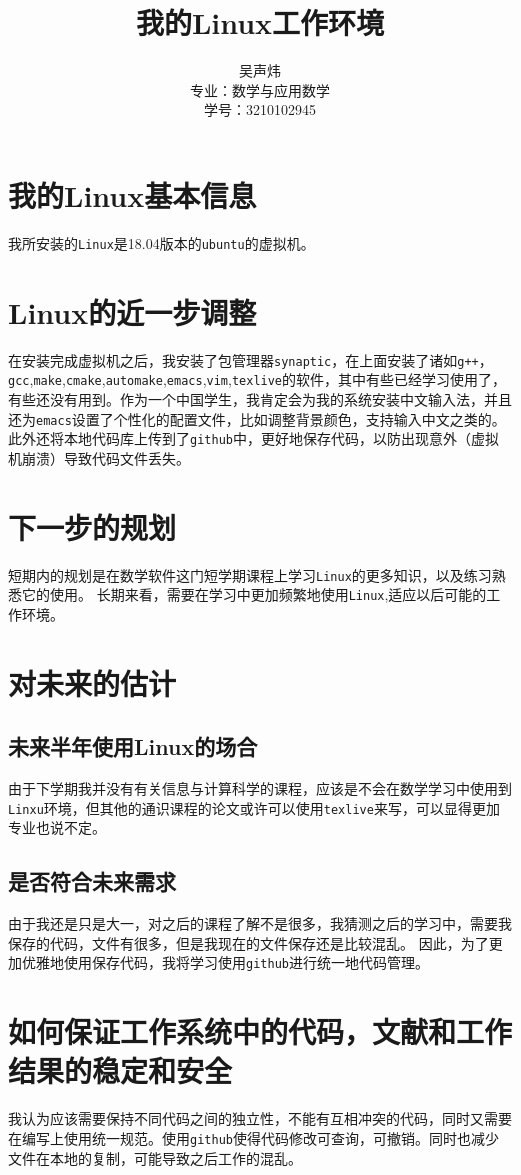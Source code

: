 \documentclass{ctexart}
\title{我的Linux工作环境}
\author{吴声炜\\专业：数学与应用数学\\学号：3210102945}
\begin{document}
\section{我的Linux基本信息}

我所安装的\verb|Linux|是18.04版本的\verb|ubuntu|的虚拟机。

\section{Linux的近一步调整}

在安装完成虚拟机之后，我安装了包管理器\verb|synaptic|，在上面安装了诸如\verb|g++|，\verb|gcc|,\verb|make|,\verb|cmake|,\verb|automake|,\verb|emacs|,\verb|vim|,\verb|texlive|的软件，其中有些已经学习使用了，有些还没有用到。作为一个中国学生，我肯定会为我的系统安装中文输入法，并且还为\verb|emacs|设置了个性化的配置文件，比如调整背景颜色，支持输入中文之类的。此外还将本地代码库上传到了\verb|github|中，更好地保存代码，以防出现意外（虚拟机崩溃）导致代码文件丢失。

\section{下一步的规划}

短期内的规划是在数学软件这门短学期课程上学习\verb|Linux|的更多知识，以及练习熟悉它的使用。
长期来看，需要在学习中更加频繁地使用\verb|Linux|,适应以后可能的工作环境。

\section{对未来的估计}
\subsection{未来半年使用Linux的场合}

由于下学期我并没有有关信息与计算科学的课程，应该是不会在数学学习中使用到\verb|Linxu|环境，但其他的通识课程的论文或许可以使用\verb|texlive|来写，可以显得更加专业也说不定。

\subsection{是否符合未来需求}

由于我还是只是大一，对之后的课程了解不是很多，我猜测之后的学习中，需要我保存的代码，文件有很多，但是我现在的文件保存还是比较混乱。
因此，为了更加优雅地使用保存代码，我将学习使用\verb|github|进行统一地代码管理\cite{Git教程-廖雪峰的官方网站}。

\section{如何保证工作系统中的代码，文献和工作结果的稳定和安全}

我认为应该需要保持不同代码之间的独立性，不能有互相冲突的代码，同时又需要在编写上使用统一规范。使用\verb|github|使得代码修改可查询，可撤销。同时也减少文件在本地的复制，可能导致之后工作的混乱。



\end{document}
